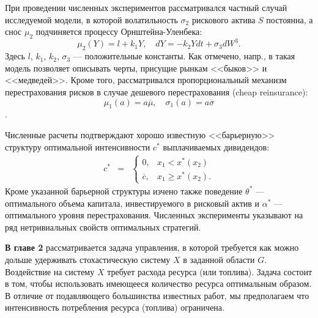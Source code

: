 При проведении численных экспериментов рассматривался частный случай исследуемой модели, в которой волатильность $\sigma_2$ рискового актива $S$ постоянна, а снос $\mu_2$ подчиняется процессу Орнштейна-Уленбека:
$$\mu_2(Y) =l+ k_1 Y,\quad dY=-k_2 Y dt + \sigma_3 dW^3. $$
Здесь $l$, $k_1$, $k_2$, $\sigma_3$ --- положительные константы. Как отмечено, напр., в \cite{Ris99, LiaYueGuo11} такая модель позволяет описывать черты, присущие рынкам <<быков>> и <<медведей>>. Кроме того, рассматривался пропорциональный механизм перестрахования рисков в случае дешевого перестрахования (cheap reinsurance):
\begin{equation}
\mu_1(a)=a \overline\mu,\quad \sigma_1 (a)=a\overline\sigma
\end{equation}.

Численные расчеты подтверждают хорошо известную <<барьерную>> структуру оптимальной интенсивности $c^*$ выплачиваемых дивидендов:
\begin{equation}
\begin{matrix}
c^* & = & \left \{
\begin{matrix} 0,& x_1< x^*(x_2) \\
\overline c,& x_1 \ge x^*(x_2).
\end{matrix}\right.
\end{matrix}
\end{equation}
Кроме указанной барьерной структуры изчено также поведение $\theta^*$ --- оптимального объема капитала, инвестируемого в рисковый актив и $\alpha^*$ --- оптимального уровня перестрахования. Численных эксперименты указывают на ряд нетривиальных свойств оптимальных стратегий.

\textbf{В главе 2} рассматривается задача управления, в которой требуется как можно дольше удерживать стохастическую систему $X$ в заданной области $G$. Воздействие на систему $X$ требует расхода ресурса (или топлива). Задача состоит в том, чтобы использовать имеющееся количество ресурса оптимальным образом.
В отличие от подавляющего большинства известных работ, мы предполагаем что интенсивность потребления ресурса (топлива) ограничена.

